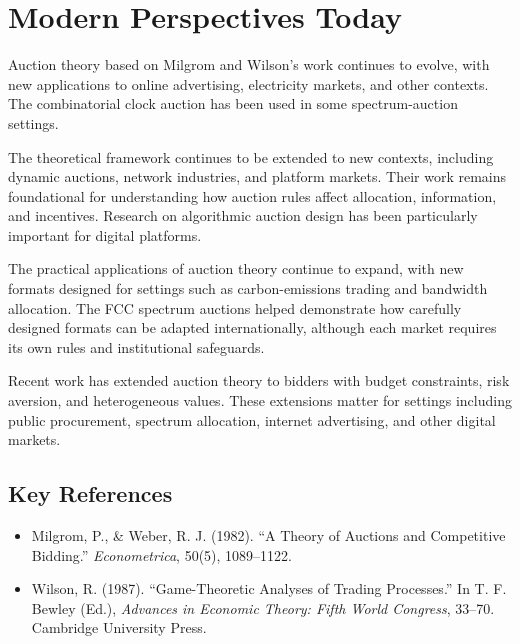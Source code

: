 \section{Modern Perspectives Today}
Auction theory based on Milgrom and Wilson's work continues to evolve, with new
applications to online advertising, electricity markets, and other contexts. The
combinatorial clock auction has been used in some spectrum-auction settings.

The theoretical framework continues to be extended to new contexts, including
dynamic auctions, network industries, and platform markets. Their work remains
foundational for understanding how auction rules affect allocation, information,
and incentives. Research on algorithmic auction design has been particularly
important for digital platforms.

The practical applications of auction theory continue to expand, with new formats
designed for settings such as carbon-emissions trading and bandwidth allocation.
The FCC spectrum auctions helped demonstrate how carefully designed formats can
be adapted internationally, although each market requires its own rules and
institutional safeguards.

Recent work has extended auction theory to bidders with budget constraints,
risk aversion, and heterogeneous values. These extensions matter for settings
including public procurement, spectrum allocation, internet advertising, and other
digital markets.

\subsection*{Key References}
\begin{itemize}
    \item Milgrom, P., \& Weber, R. J. (1982). ``A Theory of Auctions and Competitive Bidding.'' \textit{Econometrica}, 50(5), 1089--1122.
    \item Wilson, R. (1987). ``Game-Theoretic Analyses of Trading Processes.'' In T. F. Bewley (Ed.), \textit{Advances in Economic Theory: Fifth World Congress}, 33--70. Cambridge University Press.
\end{itemize}
